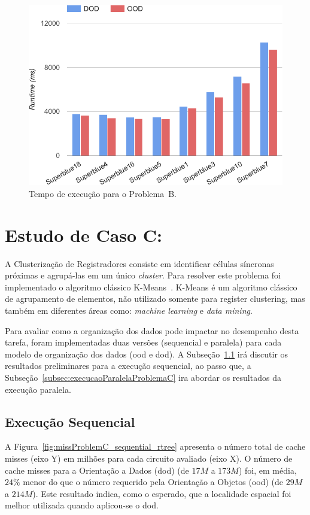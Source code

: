 \begin{figure}[ht]
    \centering
    \includegraphics[width=0.7\linewidth]{img/results/runtimeProblemB}
    \caption[Tempo de execução Problema~B]{Tempo de execução para o Problema~B.}
    \label{fig:runtimeProblemB}
\end{figure}

\section{Estudo de Caso C:}
\label{sec:problema_c}

A Clusterização de Registradores consiste em identificar células síncronas próximas e agrupá-las em um único \textit{cluster}. Para resolver este problema foi implementado o algoritmo clássico K-Means~\cite{selim1984k}. K-Means é um algoritmo clássico de agrupamento de elementos, não utilizado somente para register clustering, mas também em diferentes áreas como: \textit{machine learning} e \textit{data mining}.

Para avaliar como a organização dos dados pode impactar no desempenho desta tarefa, foram implementadas duas versões (sequencial e paralela) para cada modelo de organização dos dados (\ac{ood} e \ac{dod}).
A Subseção~\ref{subsec:execucaoSequencialProblemaC} irá discutir os resultados preliminares para a execução sequencial, ao passo que, a Subseção~\ref{subsec:execucaoParalelaProblemaC} ira abordar os resultados da execução paralela.

\subsection{Execução Sequencial}
\label{subsec:execucaoSequencialProblemaC}

A Figura~\ref{fig:missProblemC_sequential_rtree} apresenta o número total de cache misses (eixo Y) em milhões para cada circuito avaliado (eixo X).
O número de cache misses para a Orientação a Dados (\ac{dod}) (de $17M$ a $173M$) foi, em média, $24\%$ menor do que o número requerido pela Orientação a Objetos (\ac{ood}) (de $29M$ a $214M$).
Este resultado indica, como o esperado, que a localidade espacial foi melhor utilizada quando aplicou-se o \ac{dod}.

